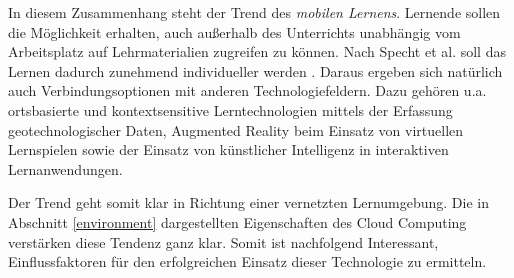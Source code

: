 In diesem Zusammenhang steht der Trend des \textit{mobilen Lernens}. Lernende sollen die Möglichkeit erhalten, auch außerhalb des Unterrichts unabhängig vom Arbeitsplatz auf Lehrmaterialien zugreifen zu können. Nach Specht et al. soll das Lernen dadurch zunehmend individueller werden \cite{specht}. Daraus ergeben sich natürlich auch Verbindungsoptionen mit anderen Technologiefeldern. Dazu gehören u.a. ortsbasierte und kontextsensitive Lerntechnologien mittels der Erfassung geotechnologischer Daten, Augmented Reality beim Einsatz von virtuellen Lernspielen sowie der Einsatz von künstlicher Intelligenz in interaktiven Lernanwendungen.

Der Trend geht somit klar in Richtung einer vernetzten Lernumgebung. Die in Abschnitt \ref{environment} dargestellten Eigenschaften des Cloud Computing verstärken diese Tendenz ganz klar. Somit ist nachfolgend Interessant, Einflussfaktoren für den erfolgreichen Einsatz dieser Technologie zu ermitteln.